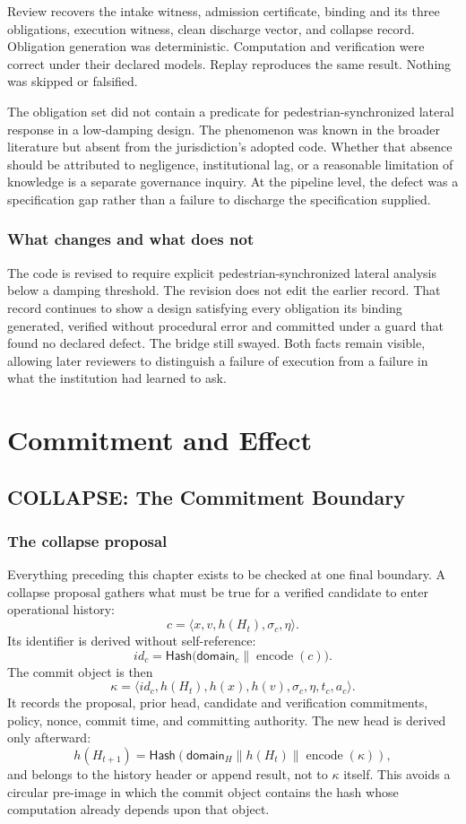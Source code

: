 \documentclass[11pt,openany]{book}
\newcommand{\Hash}{\mathsf{Hash}}
\begin{document}
Review recovers the intake witness, admission certificate, binding and its
three obligations, execution witness, clean discharge vector, and collapse
record. Obligation generation was deterministic. Computation and verification
were correct under their declared models. Replay reproduces the same result.
Nothing was skipped or falsified.

The obligation set did not contain a predicate for pedestrian-synchronized
lateral response in a low-damping design. The phenomenon was known in the
broader literature but absent from the jurisdiction's adopted code. Whether
that absence should be attributed to negligence, institutional lag, or a
reasonable limitation of knowledge is a separate governance inquiry. At the
pipeline level, the defect was a specification gap rather than a failure to
discharge the specification supplied.

\section*{What changes and what does not}

The code is revised to require explicit pedestrian-synchronized lateral
analysis below a damping threshold. The revision does not edit the earlier
record. That record continues to show a design satisfying every obligation its
binding generated, verified without procedural error and committed under a
guard that found no declared defect. The bridge still swayed. Both facts remain
visible, allowing later reviewers to distinguish a failure of execution from a
failure in what the institution had learned to ask.

\part{Commitment and Effect}

\chapter{COLLAPSE: The Commitment Boundary}
\section{The collapse proposal}

Everything preceding this chapter exists to be checked at one final boundary.
A collapse proposal gathers what must be true for a verified candidate to enter
operational history:
\[
 c=\langle x,v,h(H_t),\sigma_c,\eta\rangle.
\]
Its identifier is derived without self-reference:
\[
 id_c=\Hash\bigl(\mathsf{domain}_c\parallel\operatorname{encode}(c)\bigr).
\]
The commit object is then
\[
 \kappa=\langle id_c,h(H_t),h(x),h(v),\sigma_c,
                   \eta,t_c,a_c\rangle.
\]
It records the proposal, prior head, candidate and verification commitments,
policy, nonce, commit time, and committing authority. The new head is derived
only afterward:
\[
 h(H_{t+1})=
 \Hash\!\left(\mathsf{domain}_H\parallel h(H_t)
 \parallel\operatorname{encode}(\kappa)\right),
\]
and belongs to the history header or append result, not to \(\kappa\) itself.
This avoids a circular pre-image in which the commit object contains the hash
whose computation already depends upon that object.
\end{document}
